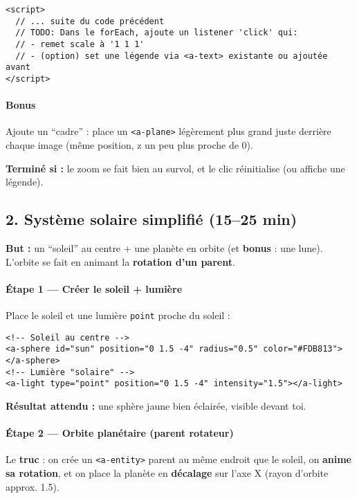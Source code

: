 \documentclass[12pt]{article}
\begin{document}
\begin{verbatim}
<script>
  // ... suite du code précédent
  // TODO: Dans le forEach, ajoute un listener 'click' qui:
  // - remet scale à '1 1 1'
  // - (option) set une légende via <a-text> existante ou ajoutée avant
</script>
\end{verbatim}

\paragraph{Bonus}
Ajoute un “cadre” : place un \texttt{<a-plane>} légèrement plus grand juste derrière chaque image (même position, z un peu plus proche de 0).

\begin{checkpoint}
\textbf{Terminé si :} le zoom se fait bien au survol, et le clic réinitialise (ou affiche une légende).
\end{checkpoint}


\subsection*{2. Système solaire simplifié (15–25 min)}

\textbf{But :} un “soleil” au centre + une planète en orbite (et \textbf{bonus} : une lune). L’orbite se fait en animant la \textbf{rotation d’un parent}.

\paragraph{Étape 1 — Créer le soleil + lumière}
Place le soleil et une lumière \texttt{point} proche du soleil :

\begin{verbatim}
<!-- Soleil au centre -->
<a-sphere id="sun" position="0 1.5 -4" radius="0.5" color="#FDB813"></a-sphere>
<!-- Lumière "solaire" -->
<a-light type="point" position="0 1.5 -4" intensity="1.5"></a-light>
\end{verbatim}

\begin{checkpoint}
\textbf{Résultat attendu :} une sphère jaune bien éclairée, visible devant toi.
\end{checkpoint}

  \paragraph{Étape 2 — Orbite planétaire (parent rotateur)}
  Le \textbf{truc} : on crée un \texttt{<a-entity>} parent au même endroit que le soleil, on \textbf{anime sa rotation}, et on place la planète en \textbf{décalage} sur l’axe X (rayon d'orbite approx. 1.5).
\end{document}

